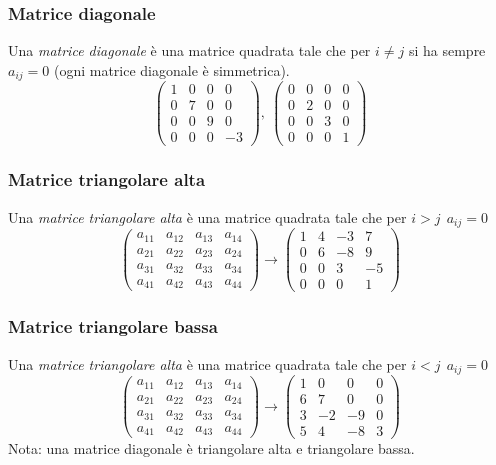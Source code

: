 \documentclass{article}
\numberwithin{equation}{subsection}
\begin{document}
\subsubsection{Matrice diagonale}
Una \textit{matrice diagonale} è una matrice quadrata tale che per $i \neq j$ si ha sempre $a_{ij}=0$ (ogni matrice diagonale è simmetrica).
$$ \begin{pmatrix} 1&0&0&0 \\ 0&7&0&0 \\ 0&0&9&0 \\ 0&0&0&-3  \end{pmatrix}, \ \begin{pmatrix} 0&0&0&0 \\ 0&2&0&0 \\ 0&0&3&0 \\ 0&0&0&1  \end{pmatrix} $$


\subsubsection{Matrice triangolare alta}
Una \textit{matrice triangolare alta} è una matrice quadrata tale che per $i>j \ \  a_{ij}=0$
$$ \begin{pmatrix} a_{11}&a_{12}&a_{13}&a_{14} \\ a_{21}&a_{22}&a_{23}&a_{24} \\ a_{31}&a_{32}&a_{33}&a_{34} \\ a_{41}&a_{42}&a_{43}&a_{44} \end{pmatrix} \rightarrow \begin{pmatrix} 1&4&-3&7 \\ 0&6&-8&9\\ 0&0&3&-5 \\ 0&0&0&1 \end{pmatrix}   $$


\subsubsection{Matrice triangolare bassa}
Una \textit{matrice triangolare alta} è una matrice quadrata tale che per $i<j \ \  a_{ij}=0$
$$ \begin{pmatrix} a_{11}&a_{12}&a_{13}&a_{14} \\ a_{21}&a_{22}&a_{23}&a_{24} \\ a_{31}&a_{32}&a_{33}&a_{34} \\ a_{41}&a_{42}&a_{43}&a_{44} \end{pmatrix} \rightarrow \begin{pmatrix}  1&0&0&0 \\ 6&7&0&0 \\ 3&-2&-9&0 \\ 5&4&-8&3 \end{pmatrix}   $$
Nota: una matrice diagonale è triangolare alta e triangolare bassa.
\end{document}
